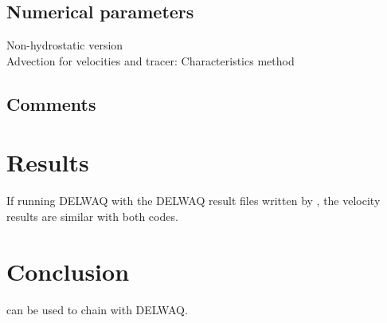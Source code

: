 \subsection{Numerical parameters}
%
Non-hydrostatic version\\
Advection for velocities and tracer: Characteristics method
%
\subsection{Comments}
%
%
%
\section{Results}
%
If running DELWAQ with the DELWAQ result files written by , the
velocity results are similar with both codes.
%
\section{Conclusion}
%
 can be used to chain with DELWAQ.
%
%
